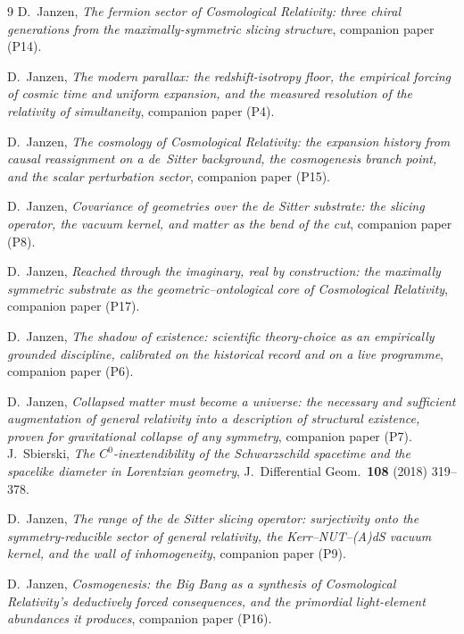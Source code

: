 \documentclass[11pt,a4paper]{article}
\theoremstyle{definition}
\begin{document}
\begin{thebibliography}{9}
 D.~Janzen, \emph{The fermion sector of Cosmological Relativity: three chiral generations from the maximally-symmetric slicing structure}, companion paper (P14).

 D.~Janzen, \emph{The modern parallax: the redshift-isotropy floor, the empirical forcing of cosmic time and uniform expansion, and the measured resolution of the relativity of simultaneity}, companion paper (P4).

 D.~Janzen, \emph{The cosmology of Cosmological Relativity: the expansion history from causal reassignment on a de~Sitter background, the cosmogenesis branch point, and the scalar perturbation sector}, companion paper (P15).

D.~Janzen,
\emph{Covariance of geometries over the de Sitter substrate: the slicing operator, the vacuum kernel, and matter as the bend of the cut}, companion paper (P8).

D.~Janzen,
\emph{Reached through the imaginary, real by construction: the maximally symmetric substrate as the geometric--ontological core of Cosmological Relativity}, companion paper (P17).

 D.~Janzen, \emph{The shadow of existence: scientific theory-choice as an empirically grounded discipline, calibrated on the historical record and on a live programme}, companion paper (P6).

 D.~Janzen, \emph{Collapsed matter must become a universe: the necessary and sufficient augmentation of general relativity into a description of structural existence, proven for gravitational collapse of any symmetry}, companion paper (P7).
J.~Sbierski,
\emph{The $C^0$-inextendibility of the Schwarzschild spacetime and the spacelike diameter in Lorentzian geometry},
J.~Differential Geom.~\textbf{108} (2018) 319--378.

D.~Janzen,
\emph{The range of the de Sitter slicing operator: surjectivity onto the symmetry-reducible sector of general relativity, the Kerr--NUT--(A)dS vacuum kernel, and the wall of inhomogeneity}, companion paper (P9).

 D.~Janzen, \emph{Cosmogenesis: the Big Bang as a synthesis of Cosmological Relativity's deductively forced consequences, and the primordial light-element abundances it produces}, companion paper (P16).


\end{thebibliography}
\end{document}
